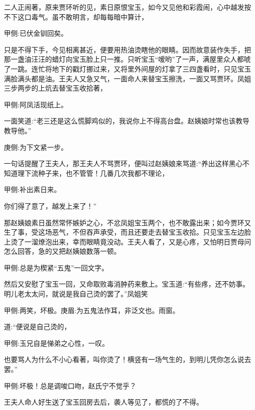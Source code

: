 \begin{parag}
    二人正闹著，原来贾环听的见，素日原恨宝玉，如今又见他和彩霞闹，心中越发按不下这口毒气。虽不敢明言，却每每暗中算计，\begin{note}甲侧:已伏金钏回矣。\end{note}只是不得下手，今见相离甚近，便要用热油烫瞎他的眼睛。因而故意装作失手，把那一盏油汪汪的蜡灯向宝玉脸上只一推。只听宝玉“嗳哟”了一声，满屋里众人都唬了一跳。连忙将地下的戳灯挪过来，又将里外间屋的灯拿了三四盏看时，只见宝玉满脸满头都是油。王夫人又急又气，一面命人来替宝玉擦洗，一面又骂贾环。凤姐三步两步的上炕去替宝玉收拾著，\begin{note}甲侧:阿凤活现纸上。\end{note}一面笑道:“老三还是这么慌脚鸡似的，我说你上不得高台盘。赵姨娘时常也该教导教导他。”\begin{note}庚侧:为下文紧一步。\end{note}一句话提醒了王夫人，那王夫人不骂贾环，便叫过赵姨娘来骂道:“养出这样黑心不知道理下流种子来，也不管管！几番几次我都不理论，\begin{note}甲侧:补出素日来。\end{note}你们得了意了，越发上来了！”
\end{parag}


\begin{parag}
    那赵姨娘素日虽然常怀嫉妒之心，不忿凤姐宝玉两个，也不敢露出来；如今贾环又生了事，受这场恶气，不但吞声承受，而且还要走去替宝玉收拾。只见宝玉左边脸上烫了一溜燎泡出来，幸而眼睛竟没动。王夫人看了，又是心疼，又怕明日贾母问怎么回答，急的又把赵姨娘数落一顿。\begin{note}甲侧:总是为楔紧“五鬼”一回文字。\end{note}然后又安慰了宝玉一回，又命取败毒消肿药来敷上。宝玉道:“有些疼，还不妨事。明儿老太太问，就说是我自己烫的罢了。”凤姐笑\begin{note}甲侧:两笑，坏极。庚眉:为五鬼法作耳，非泛文也。雨窗。\end{note}道:“便说是自己烫的，\begin{note}甲侧:玉兄自是悌弟之心性，一叹。\end{note}也要骂人为什么不小心看著，叫你烫了！横竖有一场气生的，到明儿凭你怎么说去罢。”\begin{note}甲侧:坏极！总是调唆口吻，赵氏宁不觉乎？\end{note}王夫人命人好生送了宝玉回房去后，袭人等见了，都慌的了不得。
\end{parag}


